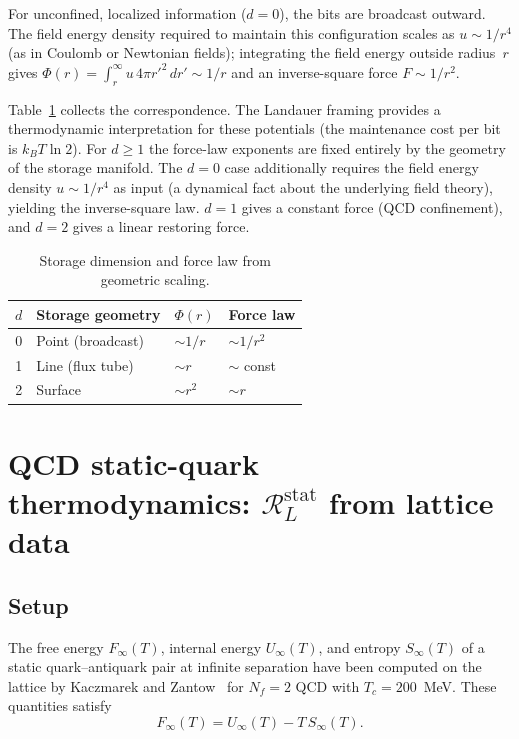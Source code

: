 \documentclass[%
 aip,
 amsmath,amssymb,
 reprint,%
]{revtex4-2}
\newcommand{\RLs}{\mathcal{R}_L^{\mathrm{stat}}}
\begin{document}
For unconfined, localized information ($d = 0$), the bits are
broadcast outward.  The field energy density required to maintain
this configuration scales as $u \sim 1/r^4$ (as in Coulomb or
Newtonian fields); integrating the field energy outside radius~$r$
gives $\Phi(r) = \int_r^{\infty} u\,4\pi r'^2\,dr' \sim 1/r$
and an inverse-square force $F \sim 1/r^2$.

Table~\ref{tab:storage_dim} collects the correspondence.
The Landauer framing provides a thermodynamic interpretation for
these potentials (the maintenance cost per bit is $k_B T \ln 2$).
For $d \geq 1$ the force-law exponents are fixed entirely by the
geometry of the storage manifold.  The $d = 0$ case additionally
requires the field energy density $u \sim 1/r^4$ as input
(a dynamical fact about the underlying field theory), yielding
the inverse-square law.
$d = 1$ gives a constant force (QCD confinement), and $d = 2$ gives
a linear restoring force.

\begin{table}[b]
\centering
\caption{Storage dimension and force law from geometric scaling.}
\label{tab:storage_dim}
\begin{tabular}{@{}clll@{}}
\toprule
$d$ & Storage geometry & $\Phi(r)$ & Force law \\
\midrule
0 & Point (broadcast) & $\sim 1/r$ & $\sim 1/r^2$ \\
1 & Line (flux tube)  & $\sim r$   & $\sim$ const \\
2 & Surface           & $\sim r^2$ & $\sim r$ \\
\bottomrule
\end{tabular}
\end{table}


\section{QCD static-quark thermodynamics: \texorpdfstring{$\RLs$}{RL-stat} from lattice data}
\label{sec:qcd}

\subsection{Setup}

The free energy $F_{\infty}(T)$, internal energy $U_{\infty}(T)$,
and entropy $S_{\infty}(T)$ of a static quark--antiquark pair at
infinite separation have been computed on the lattice by Kaczmarek and
Zantow~\cite{KZ2005a,KZ2005b} for $N_f = 2$ QCD with
$T_c = 200$~MeV.  These quantities satisfy
\begin{equation}
F_{\infty}(T) = U_{\infty}(T) - T\,S_{\infty}(T).
\end{equation}
\end{document}
